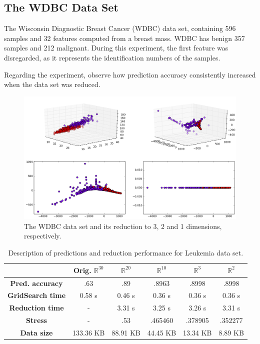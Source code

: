 \subsection{The WDBC Data Set}

The Wisconsin Diagnostic Breast Cancer (WDBC) data set, containing 596 samples and 32 features computed from a breast mass. WDBC has benign 357 samples and 212 malignant. During this experiment, the first feature was disregarded, as it represents the identification numbers of the samples.

Regarding the experiment, observe how prediction accuracy consistently increased when the data set was reduced.

\begin{figure}[H]
	\centering
	\includegraphics[width=.9\linewidth]{img/experiments/iso_wdbc}
	\captionsetup{justification=centering}
	\caption{The WDBC data set and its reduction to 3, 2 and 1 dimensions, respectively.}
	\label{fig:iso_wdbc}
\end{figure}

\begin{table}[H]
	\centering
	\begin{tabular}{|c|c|c|c|c|c|}
		\hline
		& \textbf{Orig. $\mathbb{R}^{30}$} & \textbf{$\mathbb{R}^{20}$} & \textbf{$\mathbb{R}^{10}$} & \textbf{$\mathbb{R}^{3}$} & \textbf{$\mathbb{R}^{2}$} \\\hline
		\textbf{Pred. accuracy}    & .63 & .89 & .8963 & .8998  & .8998 \\\hline
		\textbf{GridSearch time}   & 0.58 s & 0.46 s & 0.36 s & 0.36 s & 0.36 s \\\hline
		\textbf{Reduction time}    & - & 3.31 s & 3.25 s & 3.26 s & 3.31 s \\\hline
		\textbf{Stress} & - & .53 & .465460 & .378905 & .352277 \\\hline
		\textbf{Data size}  & 133.36 KB & 88.91 KB & 44.45 KB & 13.34 KB & 8.89 KB \\\hline
	\end{tabular}
	\captionsetup{justification=centering}
	\caption{Description of predictions and reduction performance for Leukemia data set.}
\end{table}

